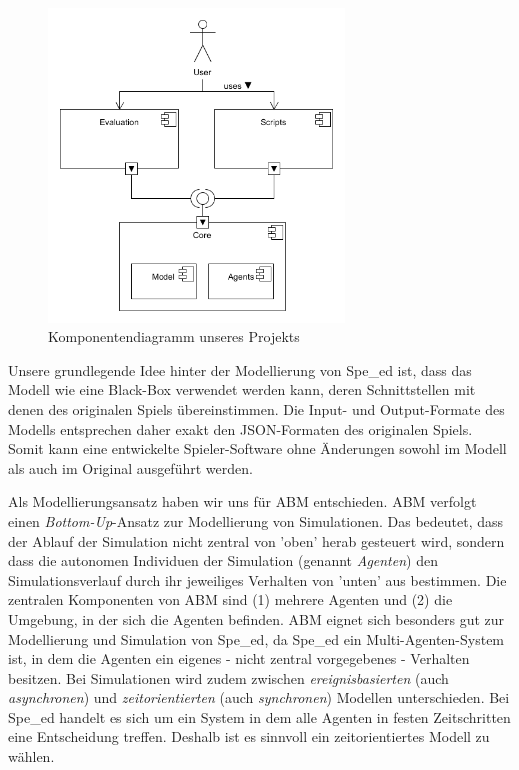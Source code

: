 \begin{figure}[ht]
    \centering
    \includegraphics[width=0.7\textwidth]{img/architecture.png}
    \caption{Komponentendiagramm unseres Projekts}
	\label{fig:komponentendiagramm}
\end{figure}

Unsere grundlegende Idee hinter der Modellierung von Spe\_ed ist, dass das Modell wie eine Black-Box verwendet werden kann, deren Schnittstellen mit denen des originalen Spiels übereinstimmen. Die Input- und Output-Formate des Modells entsprechen daher exakt den JSON-Formaten des originalen Spiels. Somit kann eine entwickelte Spieler-Software ohne Änderungen sowohl im Modell als auch im Original ausgeführt werden.

Als Modellierungsansatz haben wir uns für \acrfull{ABM} entschieden. \acrshort{ABM} verfolgt einen \textit{Bottom-Up}-Ansatz zur Modellierung von Simulationen. Das bedeutet, dass der Ablauf der Simulation nicht zentral von ’oben’ herab gesteuert wird, sondern dass die autonomen Individuen der Simulation (genannt \textit{Agenten}) den Simulationsverlauf durch ihr jeweiliges Verhalten von ’unten’ aus bestimmen. Die zentralen Komponenten von \acrshort{ABM} sind (1) mehrere Agenten und (2) die Umgebung, in der sich die Agenten befinden. \acrshort{ABM} eignet sich besonders gut zur Modellierung und Simulation von Spe\_ed, da Spe\_ed ein Multi-Agenten-System ist, in dem die Agenten ein eigenes - nicht zentral vorgegebenes - Verhalten besitzen. Bei Simulationen wird zudem zwischen \textit{ereignisbasierten} (auch \textit{asynchronen}) und \textit{zeitorientierten} (auch \textit{synchronen}) Modellen unterschieden. Bei Spe\_ed handelt es sich um ein System in dem alle Agenten in festen Zeitschritten eine Entscheidung treffen. Deshalb ist es sinnvoll ein zeitorientiertes Modell zu wählen. \cite{Bernhardt.2007, Macal.2009}

